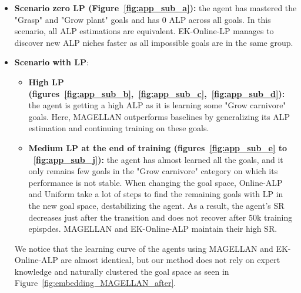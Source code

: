 \begin{itemize}
    \item\textbf{Scenario zero LP (Figure~\ref{fig:app_sub_a}):} the agent has mastered the "Grasp" and "Grow plant" goals and has $0$ ALP across all goals. In this scenario, all ALP estimations are equivalent. EK-Online-LP manages to discover new ALP niches faster as all impossible goals are in the same group.
    \item\textbf{Scenario with LP}:
    \begin{itemize}
        \item \textbf{High LP (figures~\ref{fig:app_sub_b},~\ref{fig:app_sub_c},~\ref{fig:app_sub_d}):} the agent is getting a high ALP as it is learning some "Grow carnivore" goals. Here, MAGELLAN outperforms baselines by generalizing its ALP estimation and continuing training on these goals.
        \item \textbf{Medium LP at the end of training (figures~\ref{fig:app_sub_e} to ~\ref{fig:app_sub_j}):} the agent has almost learned all the goals, and it only remains few goals in the "Grow carnivore" category on which its performance is not stable. When changing the goal space, Online-ALP and Uniform take a lot of steps to find the remaining goals with LP in the new goal space, destabilizing the agent. As a result, the agent's SR decreases just after the transition and does not recover after $50$k training epispdes. MAGELLAN and EK-Online-ALP maintain their high SR.
    \end{itemize}
    We notice that the learning curve of the agents using MAGELLAN and EK-Online-ALP are almost identical, but our method does not rely on expert knowledge and naturally clustered the goal space as seen in Figure~\ref{fig:embedding_MAGELLAN_after}.
\end{itemize}



